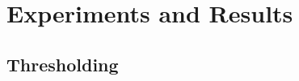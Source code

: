 \cleardoublepage
\chapter{Experiments and Results}
\label{chap:experiments}

\section{Thresholding}
\label{exp:thres}

